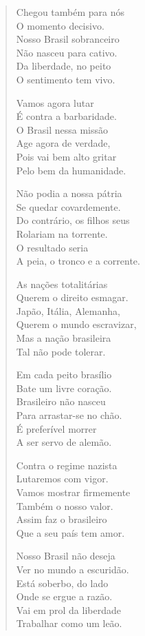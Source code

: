 \begin{verse}
Chegou também para nós\\
O momento decisivo.\\
Nosso Brasil sobranceiro\\
Não nasceu para cativo.\\
Da liberdade, no peito\\
O sentimento tem vivo.

Vamos agora lutar\\
É contra a barbaridade.\\
O Brasil nessa missão\\
Age agora de verdade,\\
Pois vai bem alto gritar\\
Pelo bem da humanidade.

Não podia a nossa pátria\\
Se quedar covardemente.\\
Do contrário, os filhos seus\\
Rolariam na torrente.\\
O resultado seria\\
A peia, o tronco e a corrente.
\pagebreak

As nações totalitárias\\
Querem o direito esmagar.\\
Japão, Itália, Alemanha,\\
Querem o mundo escravizar,\\
Mas a nação brasileira\\
Tal não pode tolerar.

Em cada peito brasílio\\
Bate um livre coração.\\
Brasileiro não nasceu\\
Para arrastar-se no chão.\\
É preferível morrer\\
A ser servo de alemão.

Contra o regime nazista\\
Lutaremos com vigor.\\
Vamos mostrar firmemente\\
Também o nosso valor.\\
Assim faz o brasileiro\\
Que a seu país tem amor.

Nosso Brasil não deseja\\
Ver no mundo a escuridão.\\
Está soberbo, do lado\\
Onde se ergue a razão.\\
Vai em prol da liberdade\\
Trabalhar como um leão.
\pagebreak


\end{verse}
